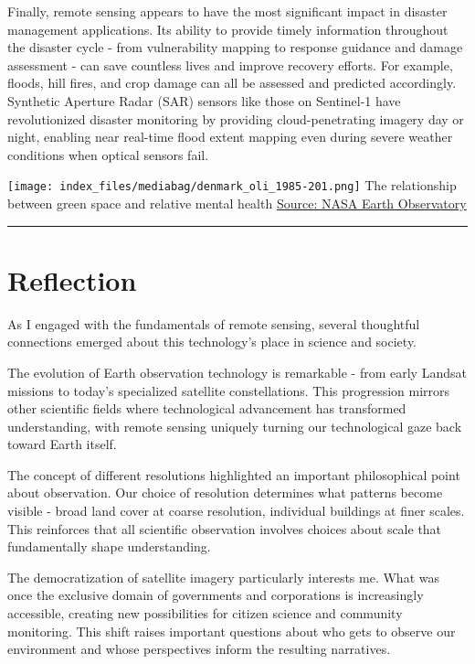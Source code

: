 \documentclass[
  letterpaper,
  DIV=11,
  numbers=noendperiod]{scrreprt}
\begin{document}
Finally, remote sensing appears to have the most significant impact in
disaster management applications. Its ability to provide timely
information throughout the disaster cycle - from vulnerability mapping
to response guidance and damage assessment - can save countless lives
and improve recovery efforts. For example, floods, hill fires, and crop
damage can all be assessed and predicted accordingly. Synthetic Aperture
Radar (SAR) sensors like those on Sentinel-1 have revolutionized
disaster monitoring by providing cloud-penetrating imagery day or night,
enabling near real-time flood extent mapping even during severe weather
conditions when optical sensors fail.

\texttt{[image: index\_files/mediabag/denmark\_oli\_1985-201.png]} The
relationship between green space and relative mental health
\href{https://earthobservatory.nasa.gov/images/145305/summer-heat-shifts-to-europe}{Source:
NASA Earth Observatory}

\begin{center}\rule{0.5\linewidth}{0.5pt}\end{center}

\section{Reflection}\label{reflection}

As I engaged with the fundamentals of remote sensing, several thoughtful
connections emerged about this technology's place in science and
society.

The evolution of Earth observation technology is remarkable - from early
Landsat missions to today's specialized satellite constellations. This
progression mirrors other scientific fields where technological
advancement has transformed understanding, with remote sensing uniquely
turning our technological gaze back toward Earth itself.

The concept of different resolutions highlighted an important
philosophical point about observation. Our choice of resolution
determines what patterns become visible - broad land cover at coarse
resolution, individual buildings at finer scales. This reinforces that
all scientific observation involves choices about scale that
fundamentally shape understanding.

The democratization of satellite imagery particularly interests me. What
was once the exclusive domain of governments and corporations is
increasingly accessible, creating new possibilities for citizen science
and community monitoring. This shift raises important questions about
who gets to observe our environment and whose perspectives inform the
resulting narratives.
\end{document}
